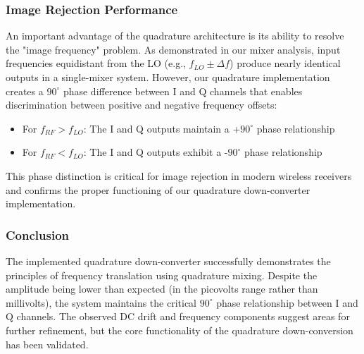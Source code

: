 \subsubsection{Image Rejection Performance}

An important advantage of the quadrature architecture is its ability to resolve the "image frequency" problem. As demonstrated in our mixer analysis, input frequencies equidistant from the LO (e.g., $f_{LO} \pm \Delta f$) produce nearly identical outputs in a single-mixer system. However, our quadrature implementation creates a $90^\circ$ phase difference between I and Q channels that enables discrimination between positive and negative frequency offsets:

\begin{itemize}
    \item For $f_{RF} > f_{LO}$: The I and Q outputs maintain a +$90^\circ$ phase relationship
    \item For $f_{RF} < f_{LO}$: The I and Q outputs exhibit a -$90^\circ$ phase relationship
\end{itemize}

This phase distinction is critical for image rejection in modern wireless receivers and confirms the proper functioning of our quadrature down-converter implementation.

\subsubsection{Conclusion}

The implemented quadrature down-converter successfully demonstrates the principles of frequency translation using quadrature mixing. Despite the amplitude being lower than expected (in the picovolts range rather than millivolts), the system maintains the critical $90^\circ$ phase relationship between I and Q channels. The observed DC drift and frequency components suggest areas for further refinement, but the core functionality of the quadrature down-conversion has been validated.